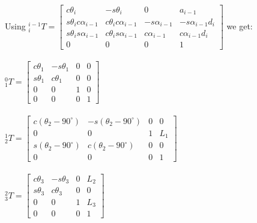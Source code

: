 \documentclass{article}
\begin{document}
Using
${}^{i-1}_{i}T=\begin{bmatrix}
c\theta_i & -s\theta_i & 0 & a_{i-1}\\
s\theta_ic\alpha_{i-1} & c\theta_ic\alpha_{i-1} & -s\alpha_{i-1} & -s\alpha_{i-1}d_{i}\\
s\theta_is\alpha_{i-1} & c\theta_is\alpha_{i-1} & c\alpha_{i-1} & c\alpha_{i-1}d_{i}\\
                0 & 0 & 0 & 1
\end{bmatrix}$ we get:\\\\
${}^{0}_{1}T=
\begin{bmatrix}
c\theta_1 & -s\theta_1 & 0 & 0\\
s\theta_1 & c\theta_1 & 0 & 0\\
0 & 0 & 1 & 0\\
0 & 0 & 0 & 1
\end{bmatrix}$\\\\
${}^{1}_{2}T=
\begin{bmatrix}
c(\theta_2-90^\circ) & -s(\theta_2-90^\circ) & 0 & 0\\
0 & 0 & 1 & L_1\\
s(\theta_2-90^\circ) & c(\theta_2-90^\circ) & 0 & 0\\
0 & 0 & 0 & 1
\end{bmatrix}$\\\\
${}^{2}_{3}T=
\begin{bmatrix}
c\theta_3 & -s\theta_3 & 0 & L_2\\
s\theta_3 & c\theta_3 & 0 & 0\\
0 & 0 & 1 & L_3\\
0 & 0 & 0 & 1
\end{bmatrix}$\\\\


%
\end{document}
